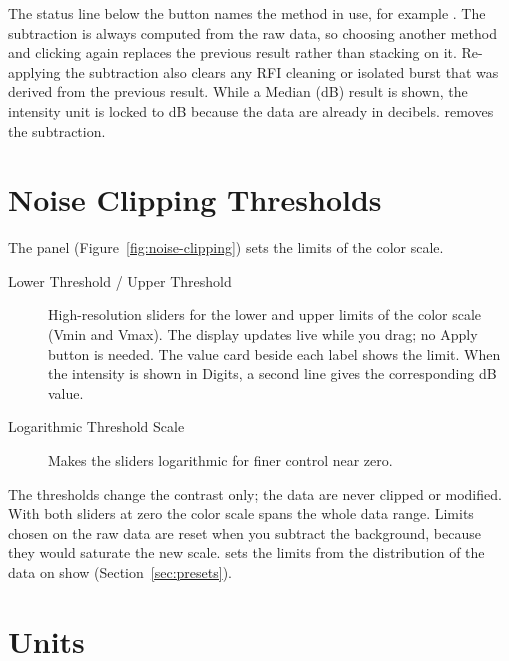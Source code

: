 The status line below the button names the method in use, for example
. The subtraction is always computed from the raw data, so
choosing another method and clicking again replaces the previous result rather than
stacking on it. Re-applying the subtraction also clears any RFI cleaning or isolated burst
that was derived from the previous result. While a Median (dB) result is shown, the
intensity unit is locked to dB because the data are already in decibels.
 removes the subtraction.

\section{Noise Clipping Thresholds}
\label{sec:thresholds}

The  panel (Figure~\ref{fig:noise-clipping}) sets the
limits of the color scale.


\begin{description}
  \item[Lower Threshold / Upper Threshold] High-resolution sliders for the lower and upper
    limits of the color scale (Vmin and Vmax). The display updates live while you drag;
    no Apply button is needed. The value card beside each label shows the limit. When the
    intensity is shown in Digits, a second line gives the corresponding dB value.
  \item[Logarithmic Threshold Scale] Makes the sliders logarithmic for finer control near
    zero.
\end{description}

The thresholds change the contrast only; the data are never clipped or modified. With
both sliders at zero the color scale spans the whole data range. Limits chosen on the raw
data are reset when you subtract the background, because they would saturate the new
scale.  sets the limits from the
distribution of the data on show (Section~\ref{sec:presets}).

\section{Units}
\label{sec:units}

